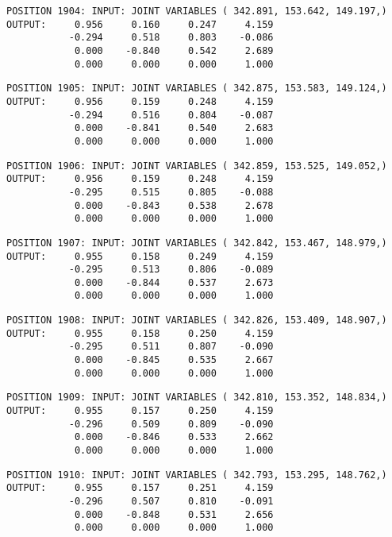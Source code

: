 \begin{verbatim}
POSITION 1904: INPUT: JOINT VARIABLES ( 342.891, 153.642, 149.197,)
OUTPUT:     0.956     0.160     0.247     4.159
           -0.294     0.518     0.803    -0.086
            0.000    -0.840     0.542     2.689
            0.000     0.000     0.000     1.000
\end{verbatim} \pagebreak[1]\begin{verbatim}
POSITION 1905: INPUT: JOINT VARIABLES ( 342.875, 153.583, 149.124,)
OUTPUT:     0.956     0.159     0.248     4.159
           -0.294     0.516     0.804    -0.087
            0.000    -0.841     0.540     2.683
            0.000     0.000     0.000     1.000
\end{verbatim} \pagebreak[1]\begin{verbatim}
POSITION 1906: INPUT: JOINT VARIABLES ( 342.859, 153.525, 149.052,)
OUTPUT:     0.956     0.159     0.248     4.159
           -0.295     0.515     0.805    -0.088
            0.000    -0.843     0.538     2.678
            0.000     0.000     0.000     1.000
\end{verbatim} \pagebreak[1]\begin{verbatim}
POSITION 1907: INPUT: JOINT VARIABLES ( 342.842, 153.467, 148.979,)
OUTPUT:     0.955     0.158     0.249     4.159
           -0.295     0.513     0.806    -0.089
            0.000    -0.844     0.537     2.673
            0.000     0.000     0.000     1.000
\end{verbatim} \pagebreak[1]\begin{verbatim}
POSITION 1908: INPUT: JOINT VARIABLES ( 342.826, 153.409, 148.907,)
OUTPUT:     0.955     0.158     0.250     4.159
           -0.295     0.511     0.807    -0.090
            0.000    -0.845     0.535     2.667
            0.000     0.000     0.000     1.000
\end{verbatim} \pagebreak[1]\begin{verbatim}
POSITION 1909: INPUT: JOINT VARIABLES ( 342.810, 153.352, 148.834,)
OUTPUT:     0.955     0.157     0.250     4.159
           -0.296     0.509     0.809    -0.090
            0.000    -0.846     0.533     2.662
            0.000     0.000     0.000     1.000
\end{verbatim} \pagebreak[1]\begin{verbatim}
POSITION 1910: INPUT: JOINT VARIABLES ( 342.793, 153.295, 148.762,)
OUTPUT:     0.955     0.157     0.251     4.159
           -0.296     0.507     0.810    -0.091
            0.000    -0.848     0.531     2.656
            0.000     0.000     0.000     1.000
\end{verbatim} \pagebreak[1]\begin{verbatim}

\end{verbatim}
